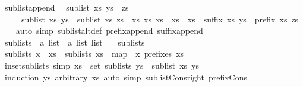 \begin{isabellebody}
\endisatagproof
{\isafoldproof}%
%
\isadelimproof
\isanewline
%
\endisadelimproof
\isanewline
\isanewline
{}\isamarkupfalse%
\ sublist{\isacharunderscore}append{\isacharcolon}\isanewline
\ \ {\isachardoublequoteopen}sublist\ xs\ {\isacharparenleft}ys\ {\isacharat}\ zs{\isacharparenright}\ {\isasymlongleftrightarrow}\ \isanewline
\ \ \ \ \ sublist\ xs\ ys\ {\isasymor}\ sublist\ xs\ zs\ {\isasymor}\ {\isacharparenleft}{\isasymexists}xs{}\ xs{}{\isachardot}\ xs\ {\isacharequal}\ xs{}\ {\isacharat}\ xs{}\ {\isasymand}\ suffix\ xs{}\ ys\ {\isasymand}\ prefix\ xs{}\ zs{\isacharparenright}{\isachardoublequoteclose}\isanewline
%
\isadelimproof
\ \ %
\endisadelimproof
%
\isatagproof
{}\isamarkupfalse%
\ {\isacharparenleft}auto\ simp{\isacharcolon}\ sublist{\isacharunderscore}altdef\ prefix{\isacharunderscore}append\ suffix{\isacharunderscore}append{\isacharparenright}%
\endisatagproof
{\isafoldproof}%
%
\isadelimproof
\isanewline
%
\endisadelimproof
\isanewline
{}\isamarkupfalse%
\ sublists\ {\isacharcolon}{\isacharcolon}\ {\isachardoublequoteopen}{\isacharprime}a\ list\ {\isasymRightarrow}\ {\isacharprime}a\ list\ list{\isachardoublequoteclose}\ \isanewline
\ \ {\isachardoublequoteopen}sublists\ {\isacharbrackleft}{\isacharbrackright}\ {\isacharequal}\ {\isacharbrackleft}{\isacharbrackleft}{\isacharbrackright}{\isacharbrackright}{\isachardoublequoteclose}\isanewline
{\isacharbar}\ {\isachardoublequoteopen}sublists\ {\isacharparenleft}x\ {\isacharhash}\ xs{\isacharparenright}\ {\isacharequal}\ sublists\ xs\ {\isacharat}\ map\ {\isacharparenleft}{\isacharparenleft}{\isacharhash}{\isacharparenright}\ x{\isacharparenright}\ {\isacharparenleft}prefixes\ xs{\isacharparenright}{\isachardoublequoteclose}\isanewline
\isanewline
{}\isamarkupfalse%
\ in{\isacharunderscore}set{\isacharunderscore}sublists\ {\isacharbrackleft}simp{\isacharbrackright}{\isacharcolon}\ {\isachardoublequoteopen}xs\ {\isasymin}\ set\ {\isacharparenleft}sublists\ ys{\isacharparenright}\ {\isasymlongleftrightarrow}\ sublist\ xs\ ys{\isachardoublequoteclose}\ \isanewline
%
\isadelimproof
\ \ %
\endisadelimproof
%
\isatagproof
{}\isamarkupfalse%
\ {\isacharparenleft}induction\ ys\ arbitrary{\isacharcolon}\ xs{\isacharparenright}\ {\isacharparenleft}auto\ simp{\isacharcolon}\ sublist{\isacharunderscore}Cons{\isacharunderscore}right\ prefix{\isacharunderscore}Cons{\isacharparenright}%
\endisatagproof
{\isafoldproof}%
%
\isadelimproof
\isanewline

\end{isabellebody}
